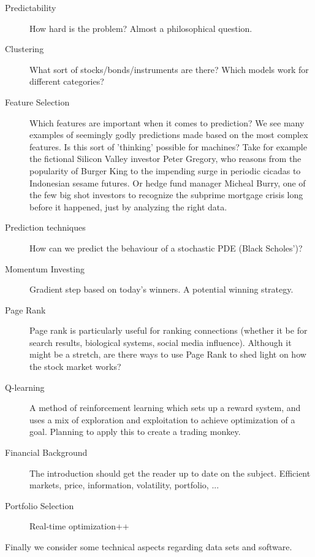 \documentclass{article}
\begin{document}
\begin{description}

\item[Predictability] How hard is the problem? Almost a philosophical question. 

\item[Clustering] What sort of stocks/bonds/instruments are there? Which models work for different categories?

\item[Feature Selection] Which features are important when it comes to prediction? We see many examples of seemingly godly predictions made based on the most complex features. Is this sort of 'thinking' possible for machines? Take for example the fictional Silicon Valley investor Peter Gregory, who reasons from the popularity of Burger King to the impending surge in periodic cicadas to Indonesian sesame futures. Or hedge fund manager Micheal Burry, one of the few big shot investors to recognize the subprime mortgage crisis long before it happened, just by analyzing the right data.

\item[Prediction techniques] How can we predict the behaviour of a stochastic PDE (Black Scholes')? 

\item[Momentum Investing] Gradient step based on today's winners. A potential winning strategy.

\item[Page Rank] Page rank is particularly useful for ranking connections (whether it be for search results, biological systems, social media influence). Although it might be a stretch, 
are there ways to use Page Rank to shed light on how the stock market works? 

\item[Q-learning] A method of reinforcement learning which sets up a reward system, and uses a mix of exploration and exploitation to achieve optimization of a goal. Planning to apply this to create a trading monkey.

\item[Financial Background] The introduction should get the reader up to date on the subject. Efficient markets, price, information, volatility, portfolio, ...

\item[Portfolio Selection] Real-time optimization++

\end{description}
Finally we consider some technical aspects regarding data sets and software.
\end{document}
